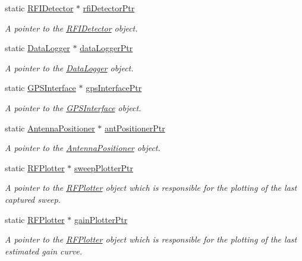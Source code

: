 \begin{DoxyCompactItemize}
static \hyperlink{classRFIDetector}{R\+F\+I\+Detector} $\ast$ \hyperlink{classSignalHandler_a9ce3533694e1e412496dc5a9b339ccc3}{rfi\+Detector\+Ptr}
\begin{DoxyCompactList}\small\item\em A pointer to the {\itshape \hyperlink{classRFIDetector}{R\+F\+I\+Detector}} object. \end{DoxyCompactList}\item 
static \hyperlink{classDataLogger}{Data\+Logger} $\ast$ \hyperlink{classSignalHandler_a114e600bdc2ad95efbc2991c97f3732c}{data\+Logger\+Ptr}
\begin{DoxyCompactList}\small\item\em A pointer to the {\itshape \hyperlink{classDataLogger}{Data\+Logger}} object. \end{DoxyCompactList}\item 
static \hyperlink{classGPSInterface}{G\+P\+S\+Interface} $\ast$ \hyperlink{classSignalHandler_ac6bc3decceefdff9d3e5c15e4125fe08}{gps\+Interface\+Ptr}
\begin{DoxyCompactList}\small\item\em A pointer to the {\itshape \hyperlink{classGPSInterface}{G\+P\+S\+Interface}} object. \end{DoxyCompactList}\item 
static \hyperlink{classAntennaPositioner}{Antenna\+Positioner} $\ast$ \hyperlink{classSignalHandler_a04f82481d0f5795308e6e2cef7bb0f88}{ant\+Positioner\+Ptr}
\begin{DoxyCompactList}\small\item\em A pointer to the {\itshape \hyperlink{classAntennaPositioner}{Antenna\+Positioner}} object. \end{DoxyCompactList}\item 
static \hyperlink{classRFPlotter}{R\+F\+Plotter} $\ast$ \hyperlink{classSignalHandler_a7ec978dc8c16c31aa8faefe4e350302c}{sweep\+Plotter\+Ptr}
\begin{DoxyCompactList}\small\item\em A pointer to the {\itshape \hyperlink{classRFPlotter}{R\+F\+Plotter}} object which is responsible for the plotting of the last captured sweep. \end{DoxyCompactList}\item 
static \hyperlink{classRFPlotter}{R\+F\+Plotter} $\ast$ \hyperlink{classSignalHandler_a040fa3711d4239933dd28a00b24965b2}{gain\+Plotter\+Ptr}
\begin{DoxyCompactList}\small\item\em A pointer to the {\itshape \hyperlink{classRFPlotter}{R\+F\+Plotter}} object which is responsible for the plotting of the last estimated gain curve. \end{DoxyCompactList}\item 

\end{DoxyCompactItemize}
